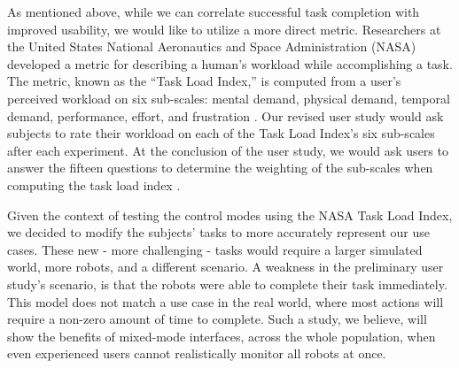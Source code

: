As mentioned above, while we can correlate successful task completion with improved usability, we would like to utilize a more direct metric. Researchers at the United States National Aeronautics and Space Administration (NASA) developed a metric for describing a human's workload while accomplishing a task. The metric, known as the ``Task Load Index,'' is computed from a user's perceived workload on six sub-scales: mental demand, physical demand, temporal demand, performance, effort, and frustration \cite{NASA_TLX}. Our revised user study would ask subjects to rate their workload on each of the Task Load Index's six sub-scales after each experiment. At the conclusion of the user study, we would ask users to answer the fifteen questions to determine the weighting of the sub-scales when computing the task load index \cite{NASA_TLX20}.

Given the context of testing the control modes using the NASA Task Load Index, we decided to modify the subjects' tasks to more accurately represent our use cases. These new - more challenging - tasks would require a larger simulated world, more robots, and a different scenario. A weakness in the preliminary user study's scenario, is that the robots were able to complete their task immediately. This model does not match a use case in the real world, where most actions will require a non-zero amount of time to complete. Such a study, we believe, will show the benefits of mixed-mode interfaces, across the whole population, when even experienced users cannot realistically monitor all robots at once.

